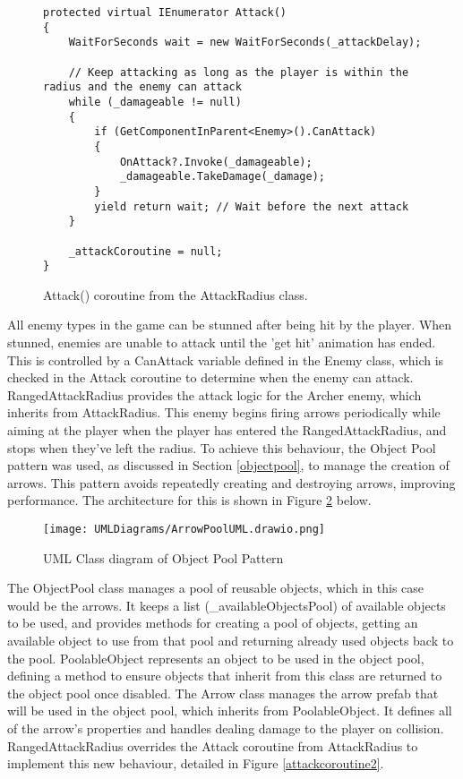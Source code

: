 \documentclass[10pt]{final_report}
\begin{document}
\begin{figure}[H]
\begin{verbatim}
protected virtual IEnumerator Attack()
{
    WaitForSeconds wait = new WaitForSeconds(_attackDelay);

    // Keep attacking as long as the player is within the radius and the enemy can attack
    while (_damageable != null)
    {
        if (GetComponentInParent<Enemy>().CanAttack)
        {
            OnAttack?.Invoke(_damageable);
            _damageable.TakeDamage(_damage);
        }
        yield return wait; // Wait before the next attack
    }

    _attackCoroutine = null;
}
\end{verbatim}
\caption{Attack() coroutine from the AttackRadius class.}
\label{attackradius}
\end{figure}

All enemy types in the game can be stunned after being hit by the player. When stunned, enemies are unable to attack until the 'get hit' animation has ended. This is controlled by a CanAttack variable defined in the Enemy class, which is checked in the Attack coroutine to determine when the enemy can attack. RangedAttackRadius provides the attack logic for the Archer enemy, which inherits from AttackRadius. This enemy begins firing arrows periodically while aiming at the player when the player has entered the RangedAttackRadius, and stops when they've left the radius. To achieve this behaviour, the Object Pool pattern was used, as discussed in Section \ref{objectpool}, to manage the creation of arrows. This pattern avoids repeatedly creating and destroying arrows, improving performance. The architecture for this is shown in Figure \ref{fig:label_objpool} below.
\begin{figure}[H]
    \centering
    \texttt{[image: UMLDiagrams/ArrowPoolUML.drawio.png]}
    \caption{UML Class diagram of Object Pool Pattern}
    \label{fig:label_objpool}
\end{figure}
The ObjectPool class manages a pool of reusable objects, which in this case would be the arrows. It keeps a list (\_availableObjectsPool) of available objects to be used, and provides methods for creating a pool of objects, getting an available object to use from that pool and returning already used objects back to the pool. PoolableObject represents an object to be used in the object pool, defining a method to ensure objects that inherit from this class are returned to the object pool once disabled. The Arrow class manages the arrow prefab that will be used in the object pool, which inherits from PoolableObject. It defines all of the arrow's properties and handles dealing damage to the player on collision. RangedAttackRadius overrides the Attack coroutine from AttackRadius to implement this new behaviour, detailed in Figure \ref{attackcoroutine2}.
\end{document}
